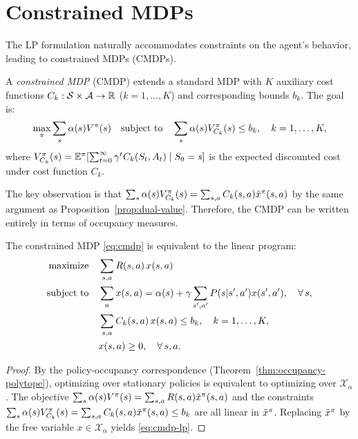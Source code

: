 \documentclass[11pt,a4paper]{article}
\begin{document}
\section{Constrained MDPs}
\label{sec:cmdp}

The LP formulation naturally accommodates constraints on the agent's
behavior, leading to constrained MDPs (CMDPs).

\begin{definition}
\label{def:cmdp}
A \emph{constrained MDP} (CMDP) extends a standard MDP with $K$
auxiliary cost functions $C_k : \mathcal{S} \times \mathcal{A} \to \mathbb{R}$
($k = 1, \ldots, K$) and corresponding bounds $b_k$. The goal is:
\begin{equation}
\label{eq:cmdp}
    \max_\pi \sum_s \alpha(s) V^{\pi}(s) \quad
    \text{subject to} \quad
    \sum_s \alpha(s) V^\pi_{C_k}(s) \leq b_k, \quad
    k = 1, \ldots, K,
\end{equation}
where $V^\pi_{C_k}(s) = \mathbb{E}^\pi[\sum_{t=0}^\infty
\gamma^t C_k(S_t, A_t) \mid S_0 = s]$ is the expected
discounted cost under cost function $C_k$.
\end{definition}

The key observation is that $\sum_s \alpha(s) V^\pi_{C_k}(s) =
\sum_{s,a} C_k(s,a) \tilde{x}^\pi(s,a)$ by the same argument
as Proposition~\ref{prop:dual-value}. Therefore, the CMDP can be
written entirely in terms of occupancy measures.

\begin{theorem}
\label{thm:cmdp-lp}
The constrained MDP \eqref{eq:cmdp} is equivalent to the linear
program:
\begin{equation}
\label{eq:cmdp-lp}
\begin{aligned}
    \text{maximize} \quad & \sum_{s,a} R(s,a)\, x(s,a) \\
    \text{subject to} \quad & \sum_a x(s,a) = \alpha(s) +
    \gamma \sum_{s',a'} P(s|s',a') x(s',a'), \quad
    \forall\, s, \\
    & \sum_{s,a} C_k(s,a)\, x(s,a) \leq b_k, \quad
    k = 1, \ldots, K, \\
    & x(s,a) \geq 0, \quad \forall\, s, a.
\end{aligned}
\end{equation}
\end{theorem}

\begin{proof}
By the policy-occupancy correspondence
(Theorem~\ref{thm:occupancy-polytope}), optimizing over stationary
policies is equivalent to optimizing over $\mathcal{X}_\alpha$.
The objective $\sum_s \alpha(s) V^{\pi}(s) = \sum_{s,a} R(s,a)
\tilde{x}^\pi(s,a)$ and the constraints
$\sum_s \alpha(s) V^\pi_{C_k}(s) = \sum_{s,a} C_k(s,a)
\tilde{x}^\pi(s,a) \leq b_k$ are all linear in
$\tilde{x}^\pi$. Replacing $\tilde{x}^\pi$ by the
free variable $x \in \mathcal{X}_\alpha$ yields \eqref{eq:cmdp-lp}.
\end{proof}
\end{document}
